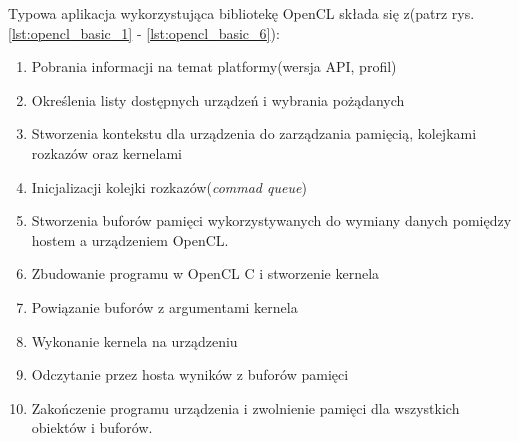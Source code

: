\documentclass[document.tex]{subfiles}
\begin{document}
\indent Typowa aplikacja wykorzystująca bibliotekę OpenCL
składa się z(patrz rys.\ref{lst:opencl_basic_1} - \ref{lst:opencl_basic_6}):
\begin{enumerate}
\item Pobrania informacji na temat platformy(wersja API, profil)

 

\item Określenia listy dostępnych urządzeń i wybrania pożądanych

 

\item Stworzenia kontekstu dla urządzenia do zarządzania pamięcią, kolejkami rozkazów oraz kernelami
\item Inicjalizacji kolejki rozkazów(\textit{commad queue})

 

\item Stworzenia buforów pamięci wykorzystywanych do 
wymiany danych pomiędzy hostem a urządzeniem OpenCL.

 

\item Zbudowanie programu w OpenCL C i stworzenie kernela 
\item Powiązanie buforów z argumentami kernela
\item Wykonanie kernela na urządzeniu

 

\item Odczytanie przez hosta wyników z buforów pamięci
\item Zakończenie programu urządzenia i zwolnienie pamięci dla wszystkich  obiektów i buforów.
 
\end{enumerate}
\end{document}
